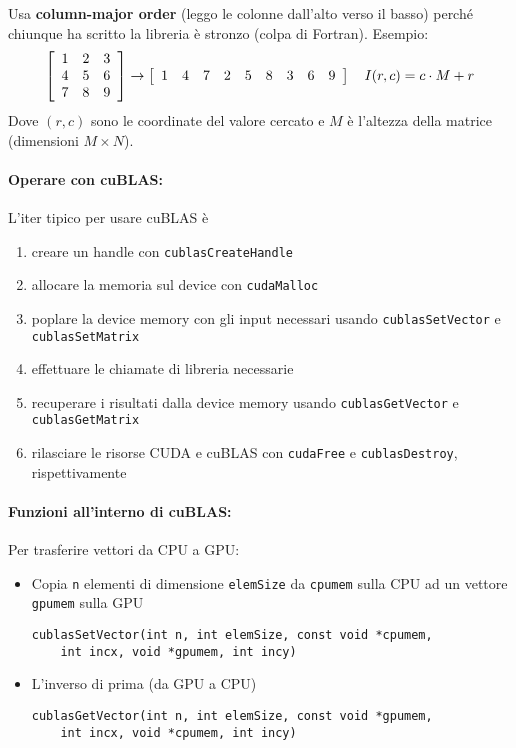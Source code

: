 Usa \textbf{column-major order} (leggo le colonne dall'alto verso il basso) perché chiunque ha scritto la libreria è stronzo (colpa di Fortran). Esempio: 
$$
\left[
\begin{array}{c c c}
	1 & 2 & 3 \\
	4 & 5 & 6 \\
	7 & 8 & 9
\end{array}
\right]
\rightarrow \left[\begin{array}{c c c c c c c c c}
	1 & 4 & 7 & 2 & 5 & 8 & 3 & 6  & 9
\end{array}\right]
\quad I(r,c) = c \cdot M  + r 
$$
Dove $(r,c)$ sono le coordinate del valore cercato e $M$ è l'altezza della matrice (dimensioni $M \times N$).\\

\paragraph{Operare con cuBLAS:} L'iter tipico per usare cuBLAS è 
\begin{enumerate}
	\item creare un handle con \texttt{cublasCreateHandle}
	\item allocare la memoria sul device con \texttt{cudaMalloc}
	\item poplare la device memory con gli input necessari usando \texttt{cublasSetVector} e \texttt{cublasSetMatrix}
	\item effettuare le chiamate di libreria necessarie
	\item recuperare i risultati dalla device memory usando \texttt{cublasGetVector} e \texttt{cublasGetMatrix}
	\item rilasciare le risorse CUDA e cuBLAS con \texttt{cudaFree} e \texttt{cublasDestroy}, rispettivamente
\end{enumerate}

\paragraph{Funzioni all'interno di cuBLAS:} Per trasferire vettori da CPU a GPU:
\begin{itemize}
	\item Copia \texttt{n} elementi di dimensione \texttt{elemSize} da \texttt{cpumem} sulla CPU ad un vettore \texttt{gpumem} sulla GPU
	\begin{verbatim}
cublasSetVector(int n, int elemSize, const void *cpumem, 
	int incx, void *gpumem, int incy)
	\end{verbatim}
	\item L'inverso di prima (da GPU a CPU)
	\begin{verbatim}
cublasGetVector(int n, int elemSize, const void *gpumem, 
	int incx, void *cpumem, int incy)
	\end{verbatim}
\end{itemize}


